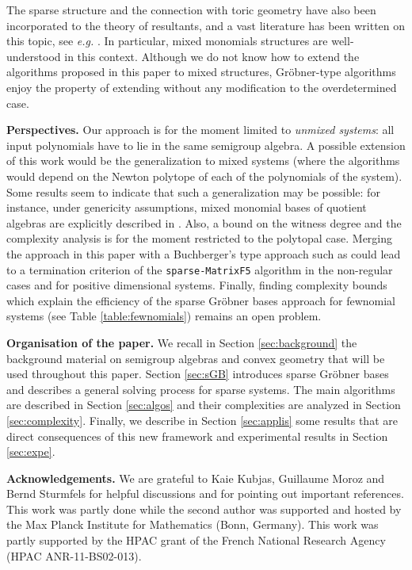 \documentclass[12pt]{article}
\numberwithin{equation}{section}
\numberwithin{theorem}{section}
\begin{document}
The sparse structure and the connection with toric geometry have also
been incorporated to the theory of resultants, and a vast literature
has been written on this topic, see \emph{e.g.}
\cite{emiris2002symbolic, emiris2005toric,
  Canny99asubdivision,canny1993efficient}. In particular, mixed
monomials structures are well-understood in this context. Although we
do not know how to extend the algorithms proposed in this paper to
mixed structures, Gr\"obner-type algorithms enjoy the property of
extending without any modification to the overdetermined case.


 {\bf Perspectives.} Our approach is for the moment limited
to \emph{unmixed systems}: all input polynomials have to lie in the
same semigroup algebra. A possible extension of this work would be the
generalization to mixed systems (where the algorithms would depend on
the Newton polytope of each of the polynomials of the system). Some
results seem to indicate that such a generalization may be possible:
for instance, under genericity assumptions, mixed monomial bases of
quotient algebras are explicitly described in
\cite{pedersen1995mixed}. Also, a bound on the witness degree and the
complexity analysis is for the moment restricted to the polytopal
case. Merging the approach in this paper with a Buchberger's type
approach such as \cite[Algo.~11.17]{Stu96} could lead to a termination
criterion of the {\tt sparse-MatrixF5} algorithm in the non-regular cases
and for positive dimensional systems. Finally, finding complexity
bounds which explain the efficiency of the sparse Gr\"obner bases
approach for fewnomial systems (see Table \ref{table:fewnomials})
remains an open problem.

 {\bf Organisation of the paper.}  We recall in Section \ref{sec:background}
the background material on semigroup algebras and convex geometry that
will be used throughout this paper. Section \ref{sec:sGB} introduces sparse Gr\"obner bases and describes a
general solving process for sparse systems. The main algorithms
are described in Section \ref{sec:algos} and their complexities are analyzed in
Section \ref{sec:complexity}. Finally, we describe in Section \ref{sec:applis} some results
that are direct consequences of this new framework and experimental results in Section \ref{sec:expe}.  

 {\bf Acknowledgements.} We are grateful to Kaie Kubjas,
Guillaume Moroz and Bernd Sturmfels for helpful discussions and for
pointing out important references. This work was partly done while the
second author was supported and hosted by the Max Planck Institute for
Mathematics (Bonn, Germany). This work was partly supported by the HPAC grant of the French National Research Agency (HPAC ANR-11-BS02-013).
\end{document}
